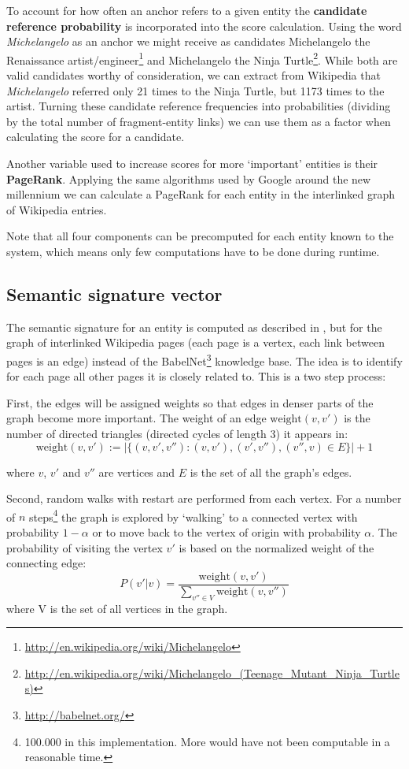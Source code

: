 \documentclass[runningheads,a4paper]{llncs}
\begin{document}
{To account for how often an anchor refers to a given entity the \textbf{candidate reference probability} is incorporated into the score calculation. Using the word \textit{Michelangelo} as an anchor we might receive as candidates Michelangelo the Renaissance artist/engineer\footnote{\url{http://en.wikipedia.org/wiki/Michelangelo}} and Michelangelo the Ninja Turtle\footnote{\url{http://en.wikipedia.org/wiki/Michelangelo_(Teenage_Mutant_Ninja_Turtles)}}. While both are valid candidates worthy of consideration, we can extract from Wikipedia that \textit{Michelangelo} referred only 21 times to the Ninja Turtle, but 1173 times to the artist. Turning these candidate reference frequencies into probabilities (dividing by the total number of fragment-entity links) we can use them as a factor when calculating the score for a candidate.

Another variable used to increase scores for more `important' entities is their \textbf{PageRank}. Applying the same algorithms used by Google around the new millennium we can calculate a PageRank for each entity in the interlinked graph of Wikipedia entries.

Note that all four components can be precomputed for each entity known to the system, which means only few computations have to be done during runtime.


\subsection{Semantic signature vector}\label{subsec:semsig}
The semantic signature for an entity is computed as described in \cite{Babelfy}, but for the graph of interlinked Wikipedia pages (each page is a vertex, each link between pages is an edge) instead of the BabelNet\footnote{\url{http://babelnet.org/}} knowledge base. The idea is to identify for each page all other pages it is closely related to. This is a two step process:

First, the edges will be assigned weights so that edges in denser parts of the graph become more important. The weight of an edge $\mathrm{weight}(v, v')$ is the number of directed triangles (directed cycles of length 3) it appears in:
$$\mathrm{weight}(v, v') := |\{(v, v', v'') : (v, v'), (v', v''), (v'', v) \in E\}| + 1$$

where $v$, $v'$ and $v''$ are vertices and $E$ is the set of all the graph's edges.

Second, random walks with restart are performed from each vertex. For a number of $n$ steps\footnote{100.000 in this implementation. More would have not been computable in a reasonable time.} the graph is explored by `walking' to a connected vertex with probability $1 - \alpha$ or to move back to the vertex of origin with probability $\alpha$. The probability of visiting the vertex $v'$ is based on the normalized weight of the connecting edge:
$$P(v'|v) = \frac{\mathrm{weight}(v, v')}{\sum _{v''\in V} \mathrm{weight}(v, v'')}$$
where V is the set of all vertices in the graph.

}
\end{document}
